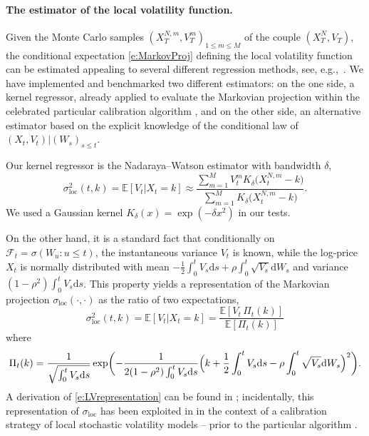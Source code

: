\documentclass[11pt]{article}
\theoremstyle{plain}
\theoremstyle{definition}
\theoremstyle{remark}
\newcommand{\be}{\beta}
\newcommand{\dd}{\mathrm{d}}
\newcommand{\bE}{\mathbb{E}}
\newcommand{\cF}{\mathcal{F}}
\newcommand{\1}{\mathbf{1}}
\numberwithin{equation}{section}
\def\be{\begin{equation}}
\def\ee{\end{equation}}
\def\sigDup{\sigma_\mathrm{loc}}
\begin{document}
\paragraph{The estimator of the local volatility function.}
Given the Monte Carlo samples $(X^{N,m}_{T}, V^m_T)_{1 \le m \le M}$ of the couple $(X_T^N, V_T)$, the conditional expectation \eqref{e:MarkovProj} defining the local volatility function can be estimated appealing to several different regression methods, see, e.g.,\ \cite{tsybakov2008introduction, henry2019non}.
We have implemented and benchmarked two different estimators: on the one side, a kernel regressor, already applied to evaluate the Markovian projection 
within the celebrated particular calibration algorithm \cite{GHL2012}, and on the other side, 
an alternative estimator based on the explicit knowledge of the conditional law of $(X_t, V_t) |(W_s)_{s \le t}$.

Our kernel regressor  is the Nadaraya--Watson estimator with bandwidth $\delta$, 
\be \label{e:kernel_reg}
\sigDup^2(t, k) 
= \mathbb E \left[V_t |X_t = k\right]
\approx
\frac{ \sum_{m=1}^M V_t^m K_{\delta} \bigl(X_t^{N,m} - k \bigr) } { \sum_{m=1}^M K_{\delta} \bigl(X_t^{N,m} - k \bigr) }.
\ee
We used a Gaussian kernel $K_{\delta}(x)=\exp(-\delta x^{2})$ in our tests.

On the other hand, it is a standard fact that conditionally on $\cF_{t}=\sigma(W_{u}:u\leq t)$, the instantaneous variance $V_t$ is known, while 
the log-price $X_{t}$ is normally distributed with mean $-\frac{1}{2}\int_{0}^{t} V_{s}\dd s + \rho\int_{0}^{t} \sqrt{V_s} \dd W_s$
and variance $(1-\rho^{2})\int_{0}^{t}V_{s}\dd s$. 
This property yields a representation of the Markovian projection $\sigDup(\cdot, \cdot)$ as the ratio of two expectations,
\begin{equation}
	\label{e:LVrepresentation}
	\sigDup^2(t, k)
	= \mathbb E \left[V_t |X_t = k\right]
	= \frac{\mathbb E \left[V_t \, \Pi_t(k) \right] }{ \mathbb E \left[\Pi_t(k)\right]} 
\end{equation}
where
\[
\Pi_t(k)
=  \frac 1 {\sqrt{\int_0^t V_s \dd s}}
\exp \biggl(
- \frac 1 {2 (1 - \rho^2) \int_0^t V_s \dd s }
\Bigl(k + \frac 12 \int_0^t V_s \dd s - \rho \int_0^t \sqrt {V_s} \dd W_s \Bigr)^2
\biggr).
\]
A derivation of \eqref{e:LVrepresentation} can be found in \cite[Proposition 3.1]{Lee2001}; incidentally, this representation of $\sigDup$ has been exploited in 
\cite{henry2009calibration} in the context of a calibration strategy of local stochastic volatility models -- prior to the particular algorithm \cite{GHL2012}.
\end{document}
